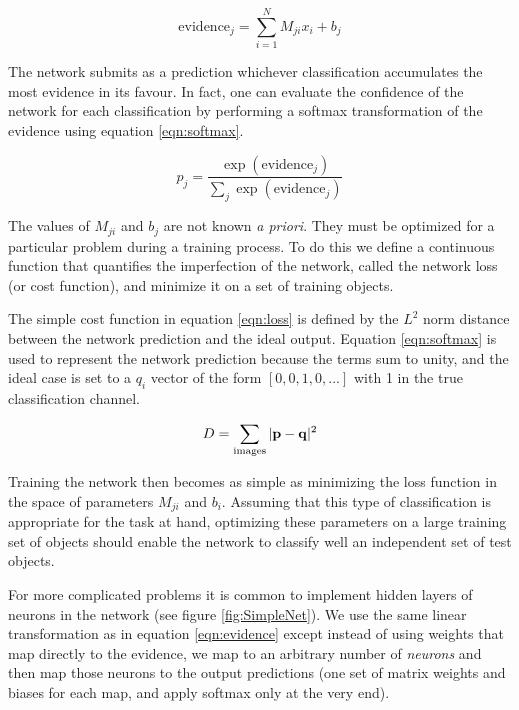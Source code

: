 \documentclass[twoside,twocolumn]{article}
\begin{document}
\begin{equation}\label{eqn:evidence}
    \text{evidence}_j = \sum_{i=1}^{N}M_{ji}x_{i} + b_j
\end{equation}

The network submits as a prediction whichever classification accumulates the most evidence in its favour. In fact, one can evaluate the confidence of the network for each classification by performing a softmax transformation of the evidence using equation \ref{eqn:softmax}.

\begin{equation}\label{eqn:softmax}
    p_j = \frac{\exp(\text{evidence}_j)}{\sum_j\exp(\text{evidence}_j)}
\end{equation}

The values of $M_{ji}$ and $b_j$ are not known \textit{a priori}. They must be optimized for a particular problem during a training process. To do this we define a continuous function that quantifies the imperfection of the network, called the network loss (or cost function), and minimize it on a set of training objects.

The simple cost function in equation \ref{eqn:loss} is defined by the $L^2$ norm distance between the network prediction and the ideal output. Equation \ref{eqn:softmax} is used to represent the network prediction because the terms sum to unity, and the ideal case is set to a $q_i$ vector of the form $[0, 0, 1, 0, ...]$ with 1 in the true classification channel.

\begin{equation}\label{eqn:loss}
    D = \sum_{\text{images}} |{\bf{p}} - {\bf{q}}|^2
\end{equation}

Training the network then becomes as simple as minimizing the loss function in the space of parameters $M_{ji}$ and $b_i$. Assuming that this type of classification is appropriate for the task at hand, optimizing these parameters on a large training set of objects should enable the network to classify well an independent set of test objects.

For more complicated problems it is common to implement hidden layers of neurons in the network (see figure \ref{fig:SimpleNet}). We use the same linear transformation as in equation \ref{eqn:evidence} except instead of using weights that map directly to the evidence, we map to an arbitrary number of \textit{neurons} and then map those neurons to the output predictions (one set of matrix weights and biases for each map, and apply softmax only at the very end).
\end{document}
